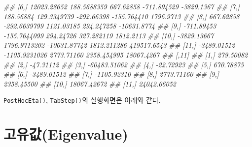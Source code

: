 \documentclass[
  10pt,
  krantz2,
  a4paper]{krantz}
\newenvironment{Shaded}{\begin{snugshade}}{\end{snugshade}}
\newcommand{\CommentTok}[1]{\textcolor[rgb]{0.56,0.35,0.01}{\textit{#1}}}
\newcommand{\DataTypeTok}[1]{\textcolor[rgb]{0.13,0.29,0.53}{#1}}
\newcommand{\KeywordTok}[1]{\textcolor[rgb]{0.13,0.29,0.53}{\textbf{#1}}}
\newcommand{\NormalTok}[1]{#1}
\theoremstyle{definition}
\theoremstyle{definition}
\theoremstyle{definition}
\theoremstyle{remark}
\begin{document}
\begin{Shaded}
\begin{Highlighting}[]
\CommentTok{\#\#  [6,] 12023.28652   188.5688359    667.62858  {-}711.894529  {-}3829.1367}
\CommentTok{\#\#  [7,]   188.56884   129.3349739   {-}292.66398  {-}155.764410   1796.9713}
\CommentTok{\#\#  [8,]   667.62858  {-}292.6639799   1121.03185   294.247258 {-}10631.8774}
\CommentTok{\#\#  [9,]  {-}711.89453  {-}155.7644099    294.24726   327.282119   1812.2113}
\CommentTok{\#\# [10,] {-}3829.13667  1796.9713202 {-}10631.87742  1812.211286 419517.6543}
\CommentTok{\#\# [11,] {-}3489.01512 {-}1105.9231026   2773.71160  2358.454995  18067.4267}
\CommentTok{\#\#              [,11]}
\CommentTok{\#\#  [1,]    279.50082}
\CommentTok{\#\#  [2,]    {-}47.31112}
\CommentTok{\#\#  [3,] {-}60483.51062}
\CommentTok{\#\#  [4,]    {-}22.72923}
\CommentTok{\#\#  [5,]    670.78875}
\CommentTok{\#\#  [6,]  {-}3489.01512}
\CommentTok{\#\#  [7,]  {-}1105.92310}
\CommentTok{\#\#  [8,]   2773.71160}
\CommentTok{\#\#  [9,]   2358.45500}
\CommentTok{\#\# [10,]  18067.42672}
\CommentTok{\#\# [11,]  24042.66052}
\end{Highlighting}
\end{Shaded}

\texttt{PostHocEta()}, \texttt{TabStep()}의 실행화면은 아래와 같다.

\begin{Shaded}
\end{Shaded}

\hypertarget{uxace0uxc720uxac12eigenvalue}{%
\section{\texorpdfstring{고유값(Eigenvalue)}{고유값(Eigenvalue)}}\label{uxace0uxc720uxac12eigenvalue}}
\end{document}

